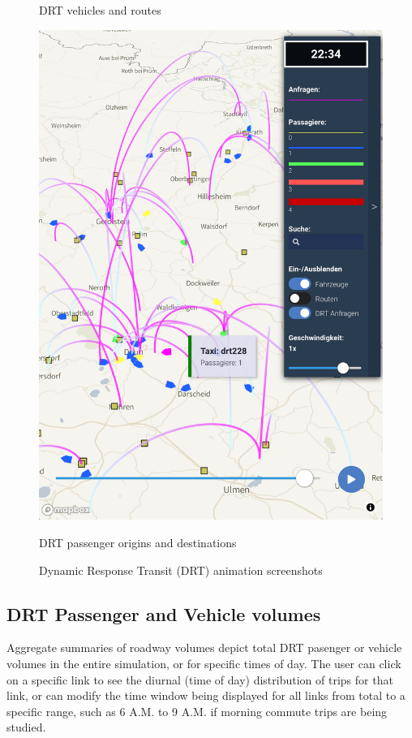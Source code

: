 \begin{figure}[ht]
\begin{minipage}[c]{0.4\textwidth}
   \caption{DRT vehicles and routes}
   \label{fig:pave-drt-vehicles-routes}
\end{minipage}
\begin{minipage}[c]{0.4\textwidth}
   \includegraphics[width=\linewidth]{chapters/22-avov/images/fig-drt-flyovers.png}
   \caption{DRT passenger origins and destinations}
   \label{fig:pave-drt-od}
\end{minipage}
\caption{Dynamic Response Transit (DRT) animation screenshots}
\end{figure}

\subsection{DRT Passenger and Vehicle volumes}

Aggregate summaries of roadway volumes depict total DRT pasenger or vehicle volumes in the entire simulation, or for specific times of day. The user can click on a specific link to see the diurnal (time of day) distribution of trips for that link, or can modify the time window being displayed for all links from total to a specific range, such as 6 A.M. to 9 A.M. if morning commute trips are being studied.

